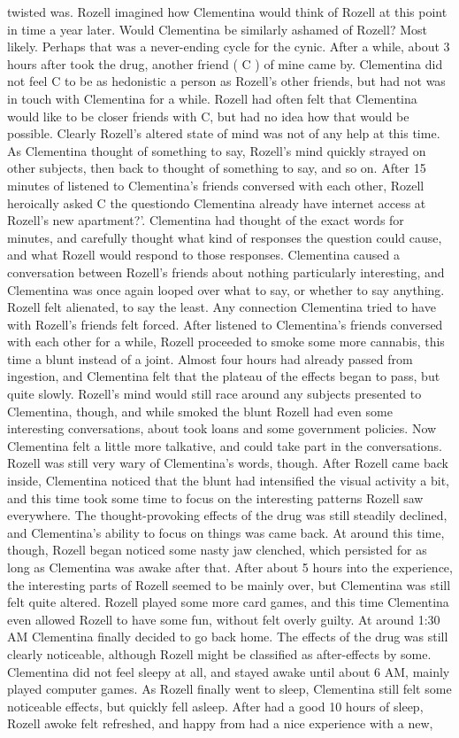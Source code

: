 \documentclass[12pt]{book}
\begin{document}
twisted was. Rozell imagined how Clementina would think of Rozell at this point in time a year later. Would Clementina be similarly ashamed of Rozell? Most likely. Perhaps that was a never-ending cycle for the cynic. After a while, about 3 hours after took the drug, another friend ( C ) of mine came by. Clementina did not feel C to be as hedonistic a person as Rozell's other friends, but had not was in touch with Clementina for a while. Rozell had often felt that Clementina would like to be closer friends with C, but had no idea how that would be possible. Clearly Rozell's altered state of mind was not of any help at this time. As Clementina thought of something to say, Rozell's mind quickly strayed on other subjects, then back to thought of something to say, and so on. After 15 minutes of listened to Clementina's friends conversed with each other, Rozell heroically asked C the questiondo Clementina already have internet access at Rozell's new apartment?'. Clementina had thought of the exact words for minutes, and carefully thought what kind of responses the question could cause, and what Rozell would respond to those responses. Clementina caused a conversation between Rozell's friends about nothing particularly interesting, and Clementina was once again looped over what to say, or whether to say anything. Rozell felt alienated, to say the least. Any connection Clementina tried to have with Rozell's friends felt forced. After listened to Clementina's friends conversed with each other for a while, Rozell proceeded to smoke some more cannabis, this time a blunt instead of a joint. Almost four hours had already passed from ingestion, and Clementina felt that the plateau of the effects began to pass, but quite slowly. Rozell's mind would still race around any subjects presented to Clementina, though, and while smoked the blunt Rozell had even some interesting conversations, about took loans and some government policies. Now Clementina felt a little more talkative, and could take part in the conversations. Rozell was still very wary of Clementina's words, though. After Rozell came back inside, Clementina noticed that the blunt had intensified the visual activity a bit, and this time took some time to focus on the interesting patterns Rozell saw everywhere. The thought-provoking effects of the drug was still steadily declined, and Clementina's ability to focus on things was came back. At around this time, though, Rozell began noticed some nasty jaw clenched, which persisted for as long as Clementina was awake after that. After about 5 hours into the experience, the interesting parts of Rozell seemed to be mainly over, but Clementina was still felt quite altered. Rozell played some more card games, and this time Clementina even allowed Rozell to have some fun, without felt overly guilty. At around 1:30 AM Clementina finally decided to go back home. The effects of the drug was still clearly noticeable, although Rozell might be classified as after-effects by some. Clementina did not feel sleepy at all, and stayed awake until about 6 AM, mainly played computer games. As Rozell finally went to sleep, Clementina still felt some noticeable effects, but quickly fell asleep. After had a good 10 hours of sleep, Rozell awoke felt refreshed, and happy from had a nice experience with a new, 
\end{document}
